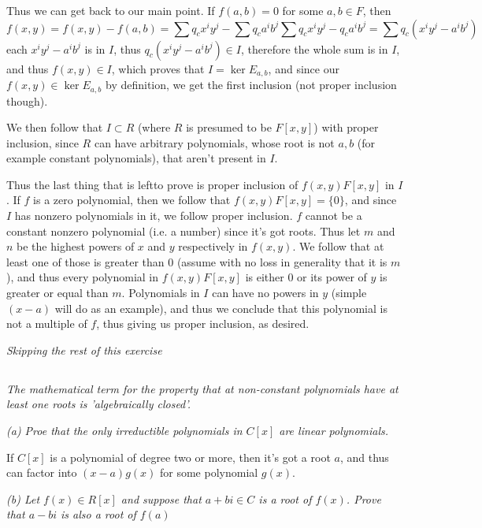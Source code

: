 \documentclass[11pt,oneside,titlepage]{book}
\newcommand{\set}[1]{\{ #1 \}}
\begin{document}
Thus we can get back to our main point. If $f(a, b) = 0$ for some $a,
b \in F$, then
$$f(x, y) = f(x, y) - f(a, b) = \sum{q_c x^i y^j} - \sum{q_c a^i b^j} 
\sum{q_c x^i y^j - q_c a^i b^j} = \sum{q_c (x^i y^j - a^i b^j)}$$ each
$x^i y^j - a^i b^j$ is in $I$, thus $q_c(x^i y^j - a^i b^j) \in I$,
therefore the whole sum is in $I$, and thus $f(x, y) \in I$, which
proves that $I = \ker{E_{a, b}}$, and since our $f(x, y) \in
\ker{E_{a, b}}$ by definition, we get the first inclusion (not proper
inclusion though).

We then follow that $I \subset R$ (where $R$ is presumed to be $F[x,
y]$) with proper inclusion, since $R$ can have arbitrary polynomials,
whose root is not $a, b$ (for example constant polynomials), that
aren't present in $I$.

Thus the last thing that is leftto prove is proper inclusion of $f(x,
y)F[x, y]$ in $I$. If $f$ is a zero polynomial, then we follow that
$f(x, y)F[x, y] = \set{0}$, and since $I$ has nonzero polynomials in
it, we follow proper inclusion. $f$ cannot be a constant nonzero
polynomial (i.e. a number) since it's got roots. Thus let $m$ and $n$
be the highest powers of $x$ and $y$ respectively in $f(x, y)$. We
follow that at least one of those is greater than $0$ (assume with no
loss in generality that it is $m$), and thus every polynomial in $f(x,
y) F[x, y]$ is either $0$ or its power of $y$ is greater or equal than
$m$. Polynomials in $I$ can have no powers in $y$ (simple $(x - a)$
will do as an example), and thus we conclude that this polynomial is
not a multiple of $f$, thus giving us proper inclusion, as desired.

\textit{Skipping the rest of this exercise}

\subsection{}

\textit{The mathematical term for the property that at non-constant
polynomials have at least one roots is 'algebraically closed'.}

\textit{(a) Proe that the only irreductible polynomials in $C[x]$ are
linear polynomials.}

If $C[x]$ is a polynomial of degree two or more, then it's got a root
$a$, and thus can factor into $(x - a)g(x)$ for some polynomial
$g(x)$.

\textit{(b) Let $f(x) \in R[x]$ and suppose that $a + bi \in C$ is a
root of $f(x)$. Prove that $a - bi$ is also a root of $f(a)$}
\end{document}
